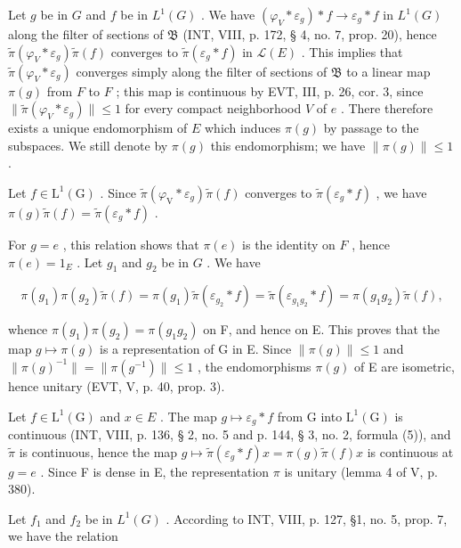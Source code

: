 Let \(g\) be in \(G\) and \(f\) be in \(L^1(G)\) . We have \((\varphi_V * \varepsilon_g) * f \to \varepsilon_g * f\) in \(L^1(G)\) along the filter of sections of \(\mathfrak{B}\) (INT, VIII, p. 172, § 4, no. 7, prop. 20), hence \(\widetilde{\pi}(\varphi_V * \varepsilon_g)\widetilde{\pi}(f)\) converges to \(\widetilde{\pi}(\varepsilon_g * f)\) in \(\mathcal{L}(E)\) . This implies that \(\widetilde{\pi}(\varphi_V * \varepsilon_g)\) converges simply along the filter of sections of \(\mathfrak{B}\) to a linear map \(\pi(g)\) from \(F\) to \(F\) ; this map is continuous by EVT, III, p. 26, cor. 3, since \(\| \widetilde{\pi}(\varphi_V * \varepsilon_g) \| \leqslant 1\) for every compact neighborhood \(V\) of \(e\) . There therefore exists a unique endomorphism of \(E\) which induces \(\pi(g)\) by passage to the subspaces. We still denote by \(\pi(g)\) this endomorphism; we have \(\| \pi(g) \| \leqslant 1\) .

Let \(f \in \mathrm{L}^1(\mathrm{G})\) . Since \(\widetilde{\pi}(\varphi_{\mathrm{V}} * \varepsilon_g) \widetilde{\pi}(f)\) converges to \(\widetilde{\pi}(\varepsilon_g * f)\) , we have \(\pi(g) \widetilde{\pi}(f) = \widetilde{\pi}(\varepsilon_g * f)\) .

For \(g = e\) , this relation shows that \(\pi(e)\) is the identity on \(F\) , hence \(\pi(e) = 1_{E}\) . Let \(g_1\) and \(g_2\) be in \(G\) . We have

\[
\pi (g _ {1}) \pi (g _ {2}) \widetilde {\pi} (f) = \pi (g _ {1}) \widetilde {\pi} (\varepsilon_ {g _ {2}} * f) = \widetilde {\pi} (\varepsilon_ {g _ {1} g _ {2}} * f) = \pi (g _ {1} g _ {2}) \widetilde {\pi} (f),
\]

whence \(\pi(g_1)\pi(g_2) = \pi(g_1g_2)\) on F, and hence on E. This proves that the map \(g \mapsto \pi(g)\) is a representation of G in E. Since \(\|\pi(g)\| \leqslant 1\) and \(\|\pi(g)^{-1}\| = \|\pi(g^{-1})\| \leqslant 1\) , the endomorphisms \(\pi(g)\) of E are isometric, hence unitary (EVT, V, p. 40, prop. 3).

Let \(f \in \mathrm{L}^{1}(\mathrm{G})\) and \(x \in E\) . The map \(g \mapsto \varepsilon_{g} * f\) from G into \(\mathrm{L}^{1}(\mathrm{G})\) is continuous (INT, VIII, p. 136, § 2, no. 5 and p. 144, § 3, no. 2, formula (5)), and \(\widetilde{\pi}\) is continuous, hence the map \(g \mapsto \widetilde{\pi}(\varepsilon_{g} * f)x = \pi(g)\widetilde{\pi}(f)x\) is continuous at \(g = e\) . Since F is dense in E, the representation \(\pi\) is unitary (lemma 4 of V, p. 380).

Let \(f_1\) and \(f_2\) be in \(L^1(G)\) . According to INT, VIII, p. 127, §1, no. 5, prop. 7, we have the relation

